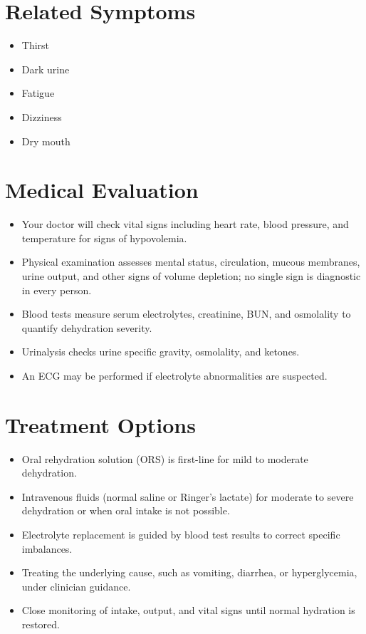 \section*{Related Symptoms}
\begin{itemize}
  \item Thirst
  \item Dark urine
  \item Fatigue
  \item Dizziness
  \item Dry mouth
\end{itemize}

\section*{Medical Evaluation}
\begin{itemize}
  \item Your doctor will check vital signs including heart rate, blood pressure, and temperature for signs of hypovolemia.
  \item Physical examination assesses mental status, circulation, mucous membranes, urine output, and other signs of volume depletion; no single sign is diagnostic in every person.
  \item Blood tests measure serum electrolytes, creatinine, BUN, and osmolality to quantify dehydration severity.
  \item Urinalysis checks urine specific gravity, osmolality, and ketones.
  \item An ECG may be performed if electrolyte abnormalities are suspected.
\end{itemize}

\section*{Treatment Options}
\begin{itemize}
  \item Oral rehydration solution (ORS) is first-line for mild to moderate dehydration.
  \item Intravenous fluids (normal saline or Ringer's lactate) for moderate to severe dehydration or when oral intake is not possible.
  \item Electrolyte replacement is guided by blood test results to correct specific imbalances.
  \item Treating the underlying cause, such as vomiting, diarrhea, or hyperglycemia, under clinician guidance.
  \item Close monitoring of intake, output, and vital signs until normal hydration is restored.
\end{itemize}

